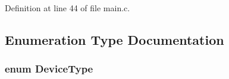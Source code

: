 \-Definition at line 44 of file main.\-c.



\subsection{\-Enumeration \-Type \-Documentation}
\hypertarget{group___copter_control_b_l_gad258d4c51629346fceac4679b3209ad9}{
\subsubsection[{\-Device\-Type}]{\setlength{\rightskip}{0pt plus 5cm}enum {\bf \-Device\-Type}}}\label{group___copter_control_b_l_gad258d4c51629346fceac4679b3209ad9}
